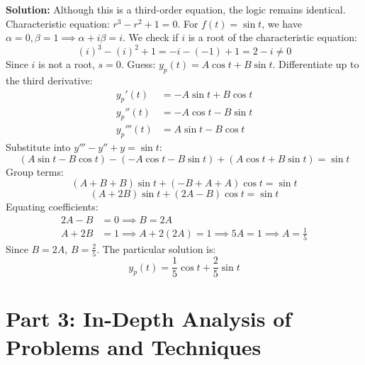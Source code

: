 \documentclass[12pt]{article}
\begin{document}
\textbf{Solution:}
Although this is a third-order equation, the logic remains identical.
Characteristic equation: $r^3 - r^2 + 1 = 0$.
For $f(t) = \sin t$, we have $\alpha = 0, \beta = 1 \implies \alpha + i\beta = i$.
We check if $i$ is a root of the characteristic equation:
\[ (i)^3 - (i)^2 + 1 = -i - (-1) + 1 = 2 - i \neq 0 \]
Since $i$ is not a root, $s = 0$.
Guess: $y_p(t) = A \cos t + B \sin t$.
Differentiate up to the third derivative:
\begin{align*}
    y_p'(t) &= -A \sin t + B \cos t \\
    y_p''(t) &= -A \cos t - B \sin t \\
    y_p'''(t) &= A \sin t - B \cos t
\end{align*}
Substitute into $y''' - y'' + y = \sin t$:
\[ (A \sin t - B \cos t) - (-A \cos t - B \sin t) + (A \cos t + B \sin t) = \sin t \]
Group terms:
\[ (A + B + B)\sin t + (-B + A + A)\cos t = \sin t \]
\[ (A + 2B)\sin t + (2A - B)\cos t = \sin t \]
Equating coefficients:
\begin{align*}
    2A - B &= 0 \implies B = 2A \\
    A + 2B &= 1 \implies A + 2(2A) = 1 \implies 5A = 1 \implies A = \frac{1}{5}
\end{align*}
Since $B = 2A$, $B = \frac{2}{5}$.
The particular solution is:
\[ y_p(t) = \frac{1}{5} \cos t + \frac{2}{5} \sin t \]

\newpage
\section{Part 3: In-Depth Analysis of Problems and Techniques}
\end{document}
